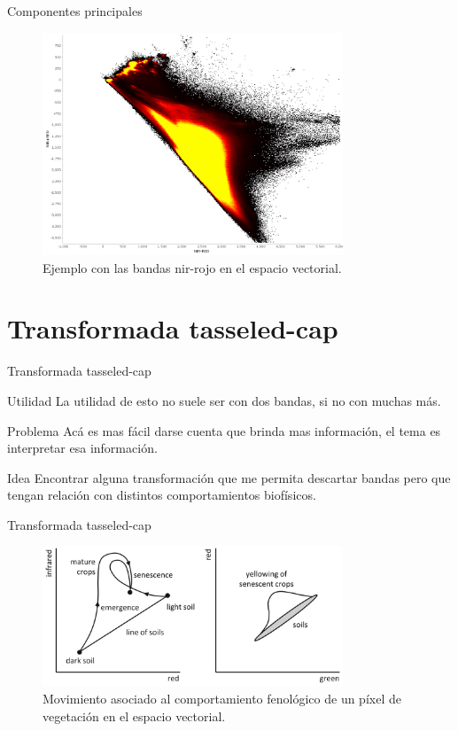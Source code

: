 \documentclass[]{beamer}
\begin{document}
\begin{frame}{Componentes principales}
  \begin{figure}
  \centering
  \includegraphics[width=0.8\textwidth]{imagenes/pca2.png}
  \caption{Ejemplo con las bandas nir-rojo en el espacio vectorial.}
  \end{figure}
\end{frame}

\section{Transformada tasseled-cap}

\begin{frame}{Transformada tasseled-cap}
  \begin{block}{Utilidad}
    La utilidad de esto no suele ser con dos bandas, si no con muchas más.
  \end{block}\pause
  \begin{block}{Problema}
    Acá es mas fácil darse cuenta que brinda mas información, el tema es interpretar esa información.
  \end{block}\pause
  \begin{block}{Idea}
    Encontrar alguna transformación que me permita descartar bandas pero que tengan relación con distintos comportamientos biofísicos.
  \end{block}
\end{frame}

\begin{frame}{Transformada tasseled-cap}
  \begin{figure}
  \centering
  \includegraphics[width=0.8\textwidth]{imagenes/tc.png}
  \caption{Movimiento asociado al comportamiento fenológico de un píxel de vegetación en el espacio vectorial.}
  \end{figure}
\end{frame}
\end{document}
